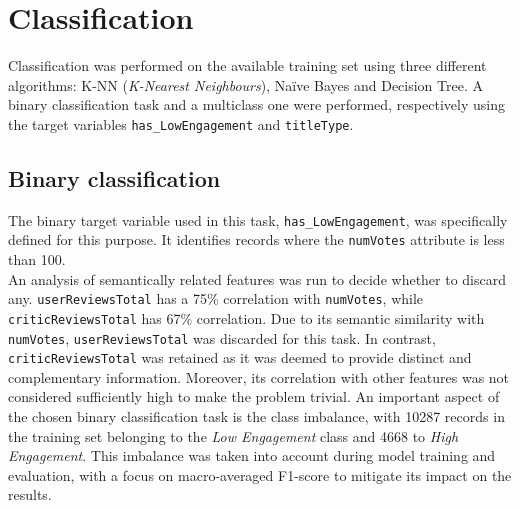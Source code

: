 
\chapter{Classification}
\label{ch:capitolo3}
Classification was performed on the available training set using three different algorithms: K-NN (\textit{K-Nearest Neighbours}), Naïve Bayes and Decision Tree.
A binary classification task and a multiclass one were performed, respectively using the target variables \texttt{has\_LowEngagement} and \texttt{titleType}.


\section{Binary classification}\label{sec:binary_classification}
The binary target variable used in this task, \texttt{has\_LowEngagement}, was specifically defined for this purpose. 
It identifies records where the \texttt{numVotes} attribute is less than 100.\\

An analysis of semantically related features was run to decide whether to discard any.
\texttt{userReviewsTotal} has a 75\% correlation with
\texttt{numVotes}, while \texttt{criticReviewsTotal} has 67\% correlation.
Due to its semantic similarity with \texttt{numVotes}, \texttt{userReviewsTotal} was discarded for this task.
In contrast, \texttt{criticReviewsTotal} was retained as it was deemed to provide distinct and complementary information. 
Moreover, its correlation with other features was not considered sufficiently high to make the problem trivial.
An important aspect of the chosen binary classification task is the class imbalance, with 10287 records in the training set
belonging to the \textit{Low Engagement} class and 4668 to \textit{High Engagement}.
This imbalance was taken into account during model training and evaluation, with a focus on
macro-averaged F1-score to mitigate its impact on the results.

